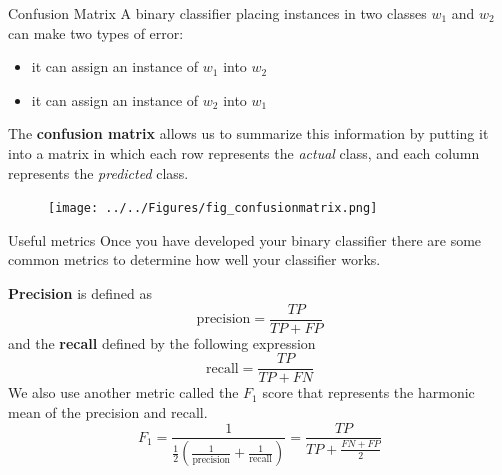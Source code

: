 \documentclass{beamer}
\begin{document}
\begin{frame}{Confusion Matrix}
	A binary classifier placing instances in two classes $w_1$ and $w_2$ can make two types of error:
	\begin{itemize}
		\item it can assign an instance of $w_1$ into $w_2$
		\item it can assign an instance of $w_2$ into $w_1$
	\end{itemize}
The {\bf confusion matrix} allows us to summarize this information by putting it into a matrix in which each row represents the {\it actual} class, and each column represents the {\it predicted} class.

\begin{figure}
	\centering
	\texttt{[image: ../../Figures/fig\_confusionmatrix.png]}
\end{figure}

\end{frame}



\begin{frame}{Useful metrics}
	Once you have developed your binary classifier there are some common metrics to determine how well your classifier works.
	
	{\bf Precision} is defined as
	\begin{equation*}
		\textrm{precision}= \frac{TP}{TP+FP}
	\end{equation*}
	and the {\bf recall}  defined by the following expression
	\begin{equation*}
		\textrm{recall}= \frac{TP}{TP+FN}
	\end{equation*}
We also use another metric called the $F_1$ score that represents the harmonic mean of the precision and recall. 
\begin{equation*}
F_1= \frac{1}{\frac{1}{2}( \frac{1}{\textrm{precision}}+ \frac{1}{\textrm{recall}})}=\frac{TP}{TP+ \frac{FN+FP}{2}}
\end{equation*}
\end{frame}	
\end{document}
